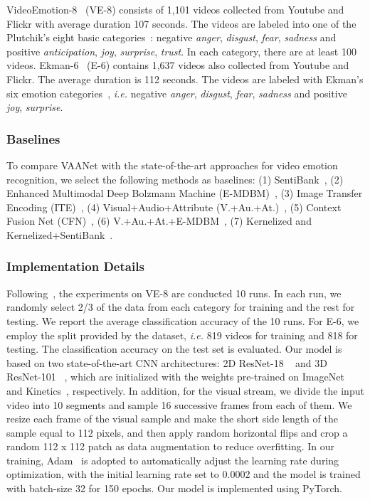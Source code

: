 \documentclass[letterpaper]{article} \usepackage{aaai20}  \usepackage{times}  \usepackage{helvet} \usepackage{courier}  \usepackage[hyphens]{url}  \usepackage{graphicx} \urlstyle{rm} \def\UrlFont{\rm}  \usepackage{graphicx}
\begin{document}
VideoEmotion-8~\cite{jiang2014predicting} (VE-8) consists of 1,101 videos collected from Youtube and Flickr with average duration 107 seconds. The videos are labeled into one of the Plutchik's eight basic categories~\cite{plutchik1980emotion}: negative \textit{anger}, \textit{disgust}, \textit{fear}, \textit{sadness} and positive \textit{anticipation}, \textit{joy}, \textit{surprise}, \textit{trust}. In each category, there are at least 100 videos. Ekman-6~\cite{xu2018heterogeneous} (E-6) contains 1,637 videos also collected from Youtube and Flickr. The average duration is 112 seconds. The videos are labeled with Ekman's six emotion categories~\cite{ekman1992argument}, \textit{i.e.}  negative \textit{anger}, \textit{disgust}, \textit{fear}, \textit{sadness} and positive \textit{joy}, \textit{surprise}.



\subsubsection{Baselines}
\label{sssec:Baselines}
To compare VAANet with the state-of-the-art approaches for video emotion recognition, we select the following methods as baselines: (1) SentiBank~\cite{borth2013sentibank}, (2) Enhanced Multimodal Deep
Bolzmann Machine (E-MDBM)~\cite{pang2015deep}, (3)  Image Transfer Encoding (ITE)~\cite{xu2018heterogeneous}, (4) Visual+Audio+Attribute (V.+Au.+At.)~\cite{jiang2014predicting}, (5) Context Fusion Net (CFN)~\cite{chen2016emotion}, (6) V.+Au.+At.+E-MDBM~\cite{pang2015deep}, (7) Kernelized and Kernelized+SentiBank~\cite{zhang2018recognition}.


\subsubsection{Implementation Details}
\label{sssec:Details}
Following~\cite{jiang2014predicting,zhang2018recognition}, the experiments on VE-8 are conducted 10 runs. In each run, we randomly select 2/3 of the data from each category for training and the rest for testing. We report the average classification accuracy of the 10 runs. For E-6, we employ the split provided by the dataset, \textit{i.e.} 819 videos for training and 818 for testing. The classification accuracy on the test set is evaluated. Our model is based on two state-of-the-art CNN architectures: 2D ResNet-18 ~\cite{he2016deep} and 3D ResNet-101 ~\cite{hara2018can}, which are initialized with the weights pre-trained on ImageNet~\cite{deng2009imagenet} and Kinetics~\cite{carreira2017quo}, respectively. In addition, for the visual stream, we divide the input video into 10 segments and sample 16 successive frames from each of them. We resize each frame of the visual sample and make the short side length of the sample equal to 112 pixels, and then apply random horizontal flips and crop a random 112 x 112 patch as data augmentation to reduce overfitting. In our training, Adam~\cite{kingma2014adam} is adopted to automatically adjust the learning rate during optimization, with the initial learning rate set to 0.0002 and the model is trained with batch-size 32 for 150 epochs. Our model is implemented using PyTorch.
\end{document}
